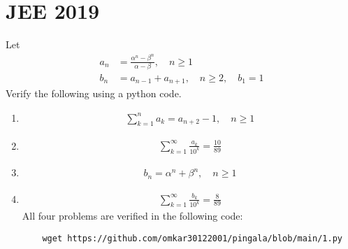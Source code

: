 \documentclass[journal,12pt,twocolumn]{IEEEtran}
\renewcommand\thesection{\arabic{section}}
\begin{document}
\section{JEE 2019}
Let 
\begin{align}
	a_n &= \frac{\alpha^{n}-\beta^{n}}{\alpha - \beta}, \quad n \ge 1
	\\
	b_n &= a_{n-1} + a_{n+1}, \quad n \ge 2, \quad b_1 =1
	\label{eq:10-orig-diff}
\end{align}
Verify the following using a python code.
\begin{enumerate}[label=\thesection.\arabic*
,ref=\thesection.\theenumi]
\item 
\begin{align}
	\sum_{k=1}^{n}a_k = a_{n+2}-1, \quad n \ge 1
\end{align}
 \item 
\begin{align}
	\sum_{k=1}^{\infty}\frac{a_k}{10^k} =\frac{10}{89}
\end{align}
 \item 
\begin{align}
	b_n =\alpha^n + \beta^n, \quad n \ge 1
\end{align}
 \item 
\begin{align}
	\sum_{k=1}^{\infty}\frac{b_k}{10^k} =\frac{8}{89}
\end{align}
All four problems are verified in the following code:
\begin{lstlisting}
	wget https://github.com/omkar30122001/pingala/blob/main/1.py
\end{lstlisting}
\end{enumerate}
\end{document}
